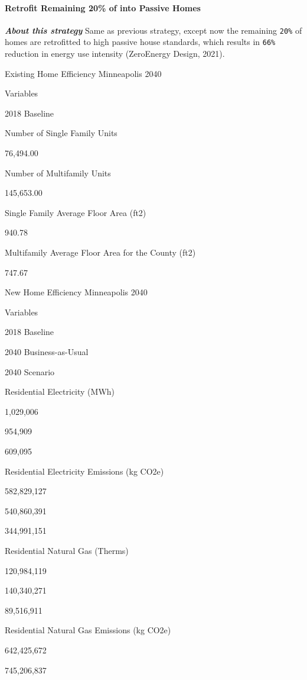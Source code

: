 \documentclass[
]{book}
\begin{document}
\hypertarget{retrofit-remaining-20-of-into-passive-homes}{%
\paragraph{Retrofit Remaining 20\% of into Passive Homes}\label{retrofit-remaining-20-of-into-passive-homes}}

\textbf{\emph{About this strategy}} Same as previous strategy, except now the remaining \texttt{20\%} of homes are retrofitted to high passive house standards, which results in \texttt{66\%} reduction in energy use intensity (ZeroEnergy Design, 2021).

\label{tab:tab-existing-home-efficiency2}Existing Home Efficiency Minneapolis 2040

Variables

2018 Baseline

Number of Single Family Units

76,494.00

Number of Multifamily Units

145,653.00

Single Family Average Floor Area (ft2)

940.78

Multifamily Average Floor Area for the County (ft2)

747.67

\label{tab:unnamed-chunk-55}New Home Efficiency Minneapolis 2040

Variables

2018 Baseline

2040 Business-as-Usual

2040 Scenario

Residential Electricity (MWh)

1,029,006

954,909

609,095

Residential Electricity Emissions (kg CO2e)

582,829,127

540,860,391

344,991,151

Residential Natural Gas (Therms)

120,984,119

140,340,271

89,516,911

Residential Natural Gas Emissions (kg CO2e)

642,425,672

745,206,837
\end{document}

